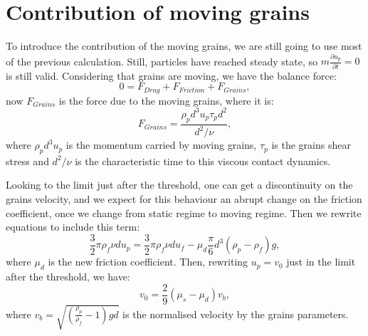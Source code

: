 \section{Contribution of moving grains}
    To introduce the contribution of the moving grains, we are still going to use most of the previous calculation. Still, particles have reached steady state, so $m\frac{\partial u_p}{\partial t} = 0$ is still valid. Considering that grains are moving, we have the balance force:
\begin{equation}
    0 = F_{Drag} + F_{Friction} + F_{Grains},
\end{equation}
now $F_{Grains}$ is the force due to the moving grains, where it is:
\begin{equation}
    F_{Grains} = \frac{\rho_p d^3 u_p \tau_p d^2}{d^2/\nu},
\end{equation}
where $\rho_p d^3 u_p$ is the momentum carried by moving grains, $\tau_p$ is the grains shear stress and $d^2/\nu$ is the characteristic time to this viscous contact dynamics.

    Looking to the limit just after the threshold, one can get a discontinuity on the grains velocity, and we expect for this behaviour an abrupt change on the friction coefficient, once we change from static regime to moving regime. Then we rewrite equations to include this term:
\begin{equation}
    \frac{3}{2}\pi\rho_f\nu d u_p = \frac{3}{2}\pi\rho_f\nu d u_f - \mu_d \frac{\pi}{6}d^3 \left(\rho_p-\rho_f\right)g,
\end{equation}
where $\mu_d$ is the new friction coefficient. Then, rewriting $u_p = v_0$ just in the limit after the threshold, we have:
\begin{equation}
    v_0 = \frac{2}{9}\left(\mu_s-\mu_d\right)v_b,
\end{equation}
where $v_b = \sqrt{\left(\frac{\rho_p}{\rho_f}-1\right)gd}$ is the normalised velocity by the grains parameters.


